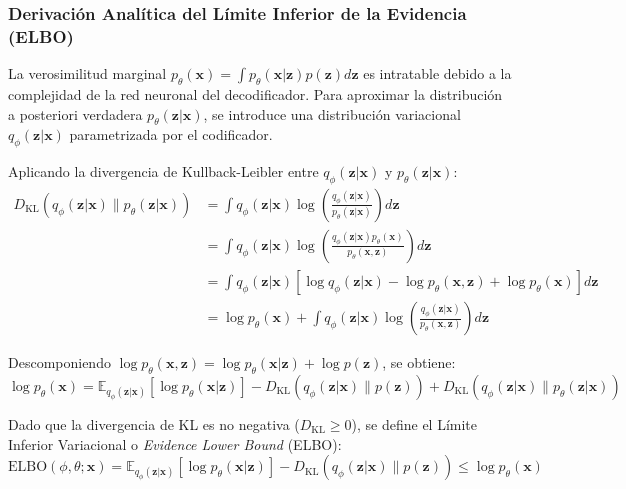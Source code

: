 \subsubsection{Derivación Analítica del Límite Inferior de la Evidencia (ELBO)}
La verosimilitud marginal $p_\theta(\mathbf{x}) = \int p_\theta(\mathbf{x}|\mathbf{z}) p(\mathbf{z}) d\mathbf{z}$ es intratable debido a la complejidad de la red neuronal del decodificador. Para aproximar la distribución a posteriori verdadera $p_\theta(\mathbf{z}|\mathbf{x})$, se introduce una distribución variacional $q_\phi(\mathbf{z}|\mathbf{x})$ parametrizada por el codificador.

Aplicando la divergencia de Kullback-Leibler entre $q_\phi(\mathbf{z}|\mathbf{x})$ y $p_\theta(\mathbf{z}|\mathbf{x})$:
\begin{align}
D_{\text{KL}}\left( q_\phi(\mathbf{z}|\mathbf{x}) \parallel p_\theta(\mathbf{z}|\mathbf{x}) \right) &= \int q_\phi(\mathbf{z}|\mathbf{x}) \log \left( \frac{q_\phi(\mathbf{z}|\mathbf{x})}{p_\theta(\mathbf{z}|\mathbf{x})} \right) d\mathbf{z} \\
&= \int q_\phi(\mathbf{z}|\mathbf{x}) \log \left( \frac{q_\phi(\mathbf{z}|\mathbf{x}) p_\theta(\mathbf{x})}{p_\theta(\mathbf{x}, \mathbf{z})} \right) d\mathbf{z} \\
&= \int q_\phi(\mathbf{z}|\mathbf{x}) \left[ \log q_\phi(\mathbf{z}|\mathbf{x}) - \log p_\theta(\mathbf{x}, \mathbf{z}) + \log p_\theta(\mathbf{x}) \right] d\mathbf{z} \\
&= \log p_\theta(\mathbf{x}) + \int q_\phi(\mathbf{z}|\mathbf{x}) \log \left( \frac{q_\phi(\mathbf{z}|\mathbf{x})}{p_\theta(\mathbf{x}, \mathbf{z})} \right) d\mathbf{z}
\end{align}

Descomponiendo $\log p_\theta(\mathbf{x}, \mathbf{z}) = \log p_\theta(\mathbf{x}|\mathbf{z}) + \log p(\mathbf{z})$, se obtiene:
\begin{equation}
\log p_\theta(\mathbf{x}) = \mathbb{E}_{q_\phi(\mathbf{z}|\mathbf{x})}\left[ \log p_\theta(\mathbf{x}|\mathbf{z}) \right] - D_{\text{KL}}\left( q_\phi(\mathbf{z}|\mathbf{x}) \parallel p(\mathbf{z}) \right) + D_{\text{KL}}\left( q_\phi(\mathbf{z}|\mathbf{x}) \parallel p_\theta(\mathbf{z}|\mathbf{x}) \right)
\end{equation}

Dado que la divergencia de KL es no negativa ($D_{\text{KL}} \ge 0$), se define el Límite Inferior Variacional o \textit{Evidence Lower Bound} (ELBO):
\begin{equation}
\text{ELBO}(\phi, \theta; \mathbf{x}) = \mathbb{E}_{q_\phi(\mathbf{z}|\mathbf{x})}\left[ \log p_\theta(\mathbf{x}|\mathbf{z}) \right] - D_{\text{KL}}\left( q_\phi(\mathbf{z}|\mathbf{x}) \parallel p(\mathbf{z}) \right) \le \log p_\theta(\mathbf{x})
\end{equation}


